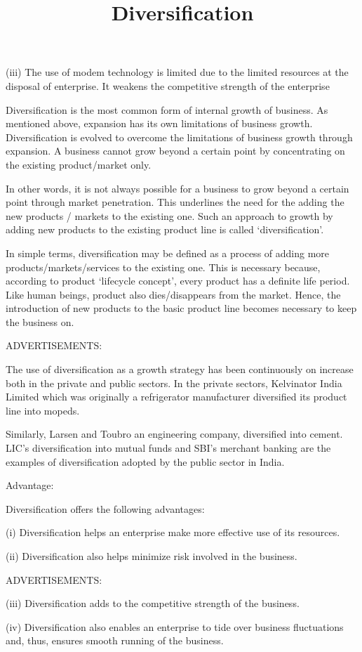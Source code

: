 \documentclass{article}
\begin{document}
(iii) The use of modem technology is limited due to the limited resources at the disposal of enterprise. It weakens the competitive
 strength of the enterprise


\title{ Diversification}
Diversification is the most common form of internal growth of business. As mentioned above, expansion has its own limitations of 
business growth. Diversification is evolved to overcome the limitations of business growth through expansion. A business cannot 
grow beyond a certain point by concentrating on the existing product/market only.

In other words, it is not always possible for a business to grow beyond a certain point through market penetration. This underlines
 the need for the adding the new products / markets to the existing one. Such an approach to growth by adding new products to the 
 existing product line is called ‘diversification’.

In simple terms, diversification may be defined as a process of adding more products/markets/services to the existing one. This is 
necessary because, according to product ‘lifecycle concept’, every product has a definite life period. Like human beings, product 
also dies/disappears from the market. Hence, the introduction of new products to the basic product line becomes necessary to keep 
the business on.

ADVERTISEMENTS:

The use of diversification as a growth strategy has been continuously on increase both in the private and public sectors. 
In the private sectors, Kelvinator India Limited which was originally a refrigerator manufacturer diversified its product 
line into mopeds.

Similarly, Larsen and Toubro  an engineering company, diversified into cement. LIC’s diversification into mutual funds and 
SBI’s merchant banking are the examples of diversification adopted by the public sector in India.

Advantage:

Diversification offers the following advantages:

(i) Diversification helps an enterprise make more effective use of its resources.

(ii) Diversification also helps minimize risk involved in the business.

ADVERTISEMENTS:

(iii) Diversification adds to the competitive strength of the business.

(iv) Diversification also enables an enterprise to tide over business fluctuations and, thus, ensures smooth running of the business.
\end{document}
